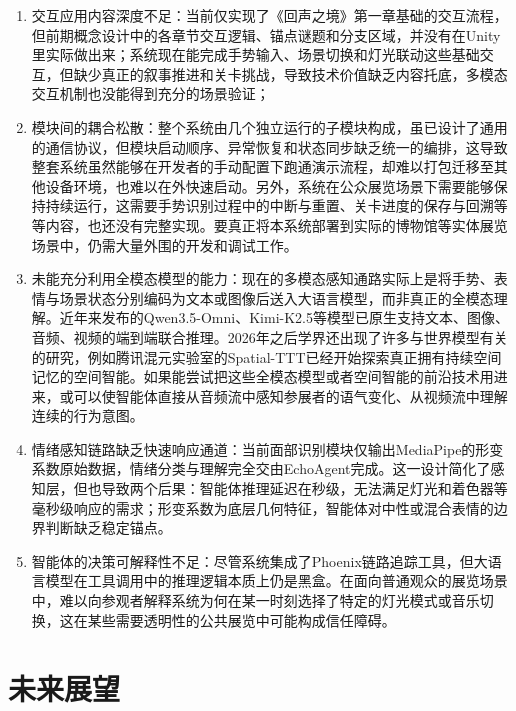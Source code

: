 \documentclass[bachelor]{njupthesis}
\begin{document}
\begin{enumerate}

\item 交互应用内容深度不足：当前仅实现了《回声之境》第一章基础的交互流程，但前期概念设计中的各章节交互逻辑、锚点谜题和分支区域，并没有在Unity里实际做出来；系统现在能完成手势输入、场景切换和灯光联动这些基础交互，但缺少真正的叙事推进和关卡挑战，导致技术价值缺乏内容托底，多模态交互机制也没能得到充分的场景验证；

\item 模块间的耦合松散：整个系统由几个独立运行的子模块构成，虽已设计了通用的通信协议，但模块启动顺序、异常恢复和状态同步缺乏统一的编排，这导致整套系统虽然能够在开发者的手动配置下跑通演示流程，却难以打包迁移至其他设备环境，也难以在外快速启动。另外，系统在公众展览场景下需要能够保持持续运行，这需要手势识别过程中的中断与重置、关卡进度的保存与回溯等等内容，也还没有完整实现。要真正将本系统部署到实际的博物馆等实体展览场景中，仍需大量外围的开发和调试工作。

\item 未能充分利用全模态模型的能力：现在的多模态感知通路实际上是将手势、表情与场景状态分别编码为文本或图像后送入大语言模型，而非真正的全模态理解。近年来发布的Qwen3.5-Omni、Kimi-K2.5等模型已原生支持文本、图像、音频、视频的端到端联合推理。2026年之后学界还出现了许多与世界模型有关的研究，例如腾讯混元实验室的Spatial-TTT已经开始探索真正拥有持续空间记忆的空间智能。如果能尝试把这些全模态模型或者空间智能的前沿技术用进来，或可以使智能体直接从音频流中感知参展者的语气变化、从视频流中理解连续的行为意图。

\item 情绪感知链路缺乏快速响应通道：当前面部识别模块仅输出MediaPipe的形变系数原始数据，情绪分类与理解完全交由EchoAgent完成。这一设计简化了感知层，但也导致两个后果：智能体推理延迟在秒级，无法满足灯光和着色器等毫秒级响应的需求；形变系数为底层几何特征，智能体对中性或混合表情的边界判断缺乏稳定锚点。

\item 智能体的决策可解释性不足：尽管系统集成了Phoenix链路追踪工具，但大语言模型在工具调用中的推理逻辑本质上仍是黑盒。在面向普通观众的展览场景中，难以向参观者解释系统为何在某一时刻选择了特定的灯光模式或音乐切换，这在某些需要透明性的公共展览中可能构成信任障碍。
\end{enumerate}


\section{未来展望}
\end{document}
